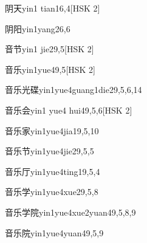 \begin{entry}{阴天}{yin1 tian1}{6,4}[HSK 2]
\end{entry}

\begin{entry}{阴阳}{yin1yang2}{6,6}
\end{entry}

\begin{entry}{音节}{yin1 jie2}{9,5}[HSK 2]
\end{entry}

\begin{entry}{音乐}{yin1yue4}{9,5}[HSK 2]
\end{entry}

\begin{entry}{音乐光碟}{yin1yue4guang1die2}{9,5,6,14}
\end{entry}

\begin{entry}{音乐会}{yin1 yue4 hui4}{9,5,6}[HSK 2]
\end{entry}

\begin{entry}{音乐家}{yin1yue4jia1}{9,5,10}
\end{entry}

\begin{entry}{音乐节}{yin1yue4jie2}{9,5,5}
\end{entry}

\begin{entry}{音乐厅}{yin1yue4ting1}{9,5,4}
\end{entry}

\begin{entry}{音乐学}{yin1yue4xue2}{9,5,8}
\end{entry}

\begin{entry}{音乐学院}{yin1yue4xue2yuan4}{9,5,8,9}
\end{entry}

\begin{entry}{音乐院}{yin1yue4yuan4}{9,5,9}
\end{entry}

